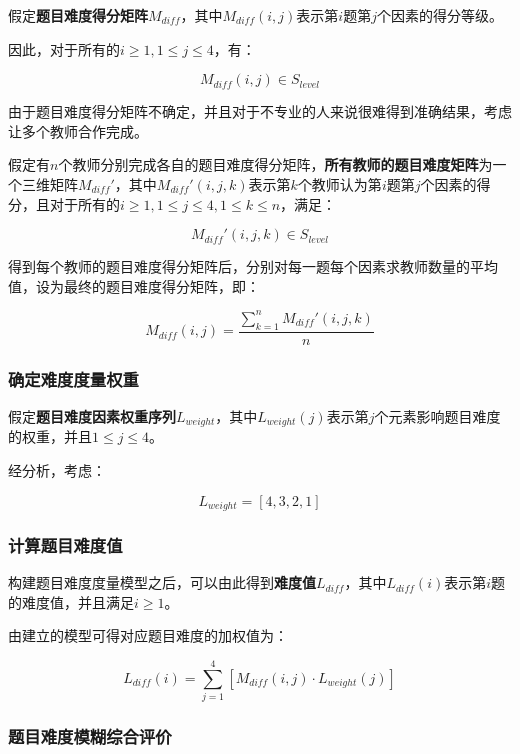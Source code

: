 假定\textbf{题目难度得分矩阵}$M_{diff}$，其中$M_{diff}(i, j)$表示第$i$题第$j$个因素的得分等级。

因此，对于所有的$i \geq 1, 1 \leq j \leq 4$，有：

$$M_{diff}(i, j)\in S_{level}$$

由于题目难度得分矩阵不确定，并且对于不专业的人来说很难得到准确结果，考虑让多个教师合作完成。

假定有$n$个教师分别完成各自的题目难度得分矩阵，\textbf{所有教师的题目难度矩阵}为一个三维矩阵$M_{diff}'$，其中$M_{diff}'(i, j, k)$表示第$k$个教师认为第$i$题第$j$个因素的得分，且对于所有的$i \geq 1, 1 \leq j \leq 4, 1 \leq k \leq n$，满足：

$$M_{diff}'(i, j, k)\in S_{level}$$

得到每个教师的题目难度得分矩阵后，分别对每一题每个因素求教师数量的平均值，设为最终的题目难度得分矩阵，即：

\begin{equation}
    M_{diff}(i, j) = 
    \frac{
        \sum_{k = 1}^{n}M_{diff}'(i, j, k)
    }{n}
\end{equation}

\subsubsection{确定难度度量权重}

假定\textbf{题目难度因素权重序列}$L_{weight}$，其中$L_{weight}(j)$表示第$j$个元素影响题目难度的权重，并且$1 \leq j \leq 4$。

经分析，考虑：

\begin{equation}
    L_{weight} = [4, 3, 2, 1]
\end{equation}

\subsubsection{计算题目难度值}

构建题目难度度量模型之后，可以由此得到\textbf{难度值}$L_{diff}$，其中$L_{diff}(i)$表示第$i$题的难度值，并且满足$i \geq 1$。

由建立的模型可得对应题目难度的加权值为：

\begin{equation}
    L_{diff}(i) = 
    \sum_{j = 1}^{4} \left [ 
        M_{diff}(i, j) \cdot L_{weight}(j)
    \right ]
\end{equation}

\subsubsection{题目难度模糊综合评价}

